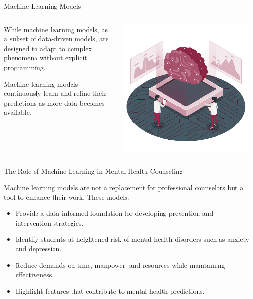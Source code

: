 \documentclass[10pt, xcolor=table]{beamer}
\let\olditem\item
\renewcommand\item{\olditem\justifying}
\begin{document}
\begin{frame}{Machine Learning Models}
	\begin{columns}[T]
		\begin{column}{0.5\textwidth}
			\justifying
			While machine learning models, as a subset of data-driven models, are designed to adapt to complex phenomena without explicit programming.
			
			\vspace{0.5cm}
			Machine learning models continuously learn and refine their predictions as more data becomes available.
		\end{column}
		\begin{column}{0.5\textwidth}
			\centering
			\includegraphics[width=\linewidth]{./figures/artificial_intelligence.png}
		\end{column}
	\end{columns}
\end{frame}


\begin{frame}{The Role of Machine Learning in Mental Health Counseling}
	
	\justifying
	Machine learning models are not a replacement for professional counselors but a tool to enhance their work. These models:
	\begin{itemize}
		\item Provide a data-informed foundation for developing prevention and intervention strategies.
		\item Identify students at heightened risk of mental health disorders such as anxiety and depression.
		\item Reduce demands on time, manpower, and resources while maintaining effectiveness.
		\item Highlight features that contribute to mental health predictions.
	\end{itemize}
	
	
\end{frame}
\end{document}
